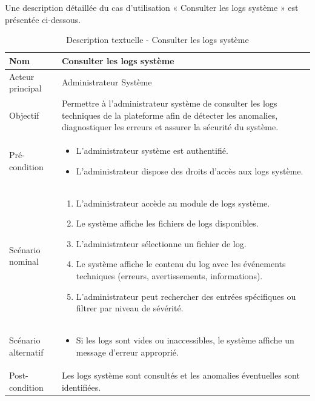 Une description détaillée du cas d'utilisation « Consulter les logs système » est présentée ci-dessous.

\begin{table}[H]
\centering
\begin{tabular}{ |p{4cm}|p{12cm}|} \hline

Nom & Consulter les logs système \\ \hline

Acteur principal & Administrateur Système \\ \hline

Objectif & Permettre à l'administrateur système de consulter les logs techniques de la plateforme afin de détecter les anomalies, diagnostiquer les erreurs et assurer la sécurité du système. \\ \hline

Pré-condition &
\begin{itemize}
    \item L'administrateur système est authentifié.
    \item L'administrateur dispose des droits d'accès aux logs système.
\end{itemize}
\\ \hline

Scénario nominal &
\begin{enumerate}
    \item L'administrateur accède au module de logs système.
    \item Le système affiche les fichiers de logs disponibles.
    \item L'administrateur sélectionne un fichier de log.
    \item Le système affiche le contenu du log avec les événements techniques (erreurs, avertissements, informations).
    \item L'administrateur peut rechercher des entrées spécifiques ou filtrer par niveau de sévérité.
\end{enumerate}
\\ \hline

Scénario alternatif &
\begin{itemize}
    \item Si les logs sont vides ou inaccessibles, le système affiche un message d'erreur approprié.
\end{itemize}
\\ \hline

Post-condition &
Les logs système sont consultés et les anomalies éventuelles sont identifiées. \\ \hline

\end{tabular}
\caption{Description textuelle - Consulter les logs système}
\label{tab:logs-systeme}
\end{table}


